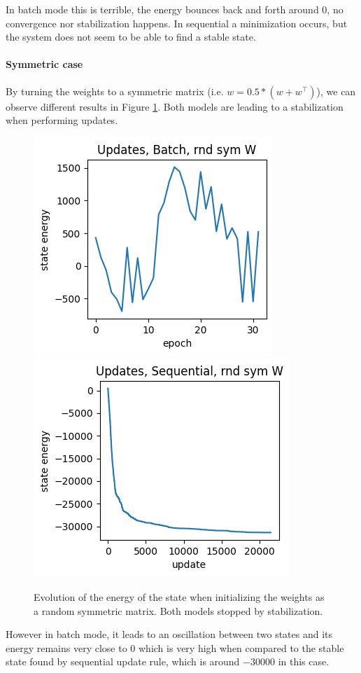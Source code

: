 \documentclass[a4paper]{article}
\begin{document}
In batch mode this is terrible, the energy bounces back and forth around 0, no convergence nor stabilization happens. In sequential a minimization occurs, but the system does not seem to be able to find a stable state. 



\paragraph{Symmetric case}
By turning the weights to a symmetric matrix (i.e. $w=0.5*(w+w^\intercal)$), we can observe different results in Figure \ref{fig:nrg_rnd_weights_sym}. Both models are leading to a stabilization when performing updates. 
\begin{figure}[h]
    \centering
    \includegraphics[width=.33\linewidth]{img/nrg_rand_w_sym_batch.png}
    \includegraphics[width=.355\linewidth]{img/nrg_rand_w_sym_seq.png}
    \caption{Evolution of the energy of the state when initializing the weights as a random symmetric matrix. Both models stopped by stabilization.}
    \label{fig:nrg_rnd_weights_sym}
\end{figure}

However in batch mode, it leads to an oscillation between two states and its energy remains very close to 0 which is very high when compared to the stable state found by sequential update rule, which is around $-30000$ in this case.
\end{document}
